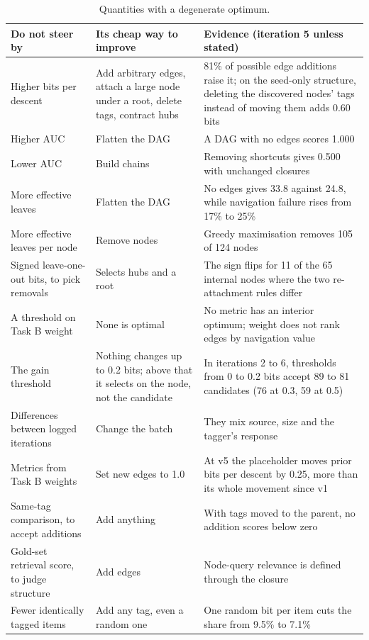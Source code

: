 \documentclass[10pt,a4paper]{article}
\newenvironment{rtable}[1]{\begin{table}[!htb]\caption{#1}\small}{\end{table}}
\begin{document}
\begin{rtable}{Quantities with a degenerate optimum.\label{tab:avoid}}
\begin{tabularx}{\linewidth}{@{}P{4.3cm} P{4.6cm} L@{}}
\toprule
Do not steer by & Its cheap way to improve & Evidence (iteration 5 unless stated) \\
\midrule
Higher bits per descent & Add arbitrary edges, attach a large node under a root, delete tags, contract hubs & 81\% of possible edge additions raise it; on the seed-only structure, deleting the discovered nodes' tags instead of moving them adds 0.60 bits \\
Higher AUC & Flatten the DAG & A DAG with no edges scores 1.000 \\
Lower AUC & Build chains & Removing shortcuts gives 0.500 with unchanged closures \\
More effective leaves & Flatten the DAG & No edges gives 33.8 against 24.8, while navigation failure rises from 17\% to 25\% \\
More effective leaves per node & Remove nodes & Greedy maximisation removes 105 of 124 nodes \\
Signed leave-one-out bits, to pick removals & Selects hubs and a root & The sign flips for 11 of the 65 internal nodes where the two re-attachment rules differ \\
A threshold on Task B weight & None is optimal & No metric has an interior optimum; weight does not rank edges by navigation value \\
The gain threshold & Nothing changes up to 0.2 bits; above that it selects on the node, not the candidate & In iterations 2 to 6, thresholds from 0 to 0.2 bits accept 89 to 81 candidates (76 at 0.3, 59 at 0.5) \\
Differences between logged iterations & Change the batch & They mix source, size and the tagger's response \\
Metrics from Task B weights & Set new edges to 1.0 & At v5 the placeholder moves prior bits per descent by 0.25, more than its whole movement since v1 \\
Same-tag comparison, to accept additions & Add anything & With tags moved to the parent, no addition scores below zero \\
Gold-set retrieval score, to judge structure & Add edges & Node-query relevance is defined through the closure \\
Fewer identically tagged items & Add any tag, even a random one & One random bit per item cuts the share from 9.5\% to 7.1\% \\

\end{tabularx}
\end{rtable}
\end{document}
